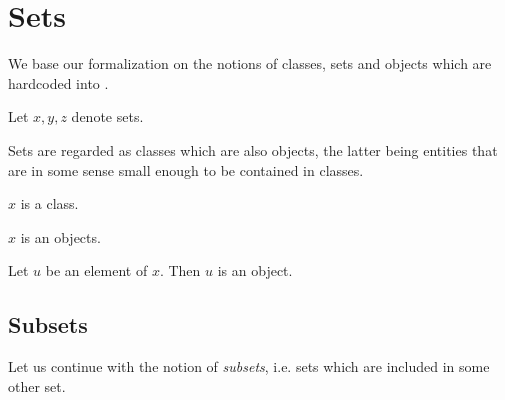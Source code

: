 \documentclass[../../set-theory.tex]{subfiles}
\begin{document}
  \section{Sets}

  \begin{forthel}
  \end{forthel}

  \begin{forthel}
  \end{forthel}

  \noindent We base our formalization on the notions of classes, sets and
  objects which are hardcoded into \Naproche.

  \begin{forthel}
    Let $x,y,z$ denote sets.
  \end{forthel}

  \noindent Sets are regarded as classes which are also objects, the latter
  being entities that are in some sense small enough to be contained in classes.

  \begin{forthel}
    \begin{axiom}\label{SetTheory_01_01_729563}
      $x$ is a class.
    \end{axiom}

    \begin{axiom}\label{SetTheory_01_01_603161}
      $x$ is an objects.
    \end{axiom}

    \begin{axiom}\label{SetTheory_01_01_617091}
      Let $u$ be an element of $x$.
      Then $u$ is an object.
    \end{axiom}
  \end{forthel}


  \subsection{Subsets}

  \noindent Let us continue with the notion of \textit{subsets}, i.e. sets
  which are included in some other set.
\end{document}
